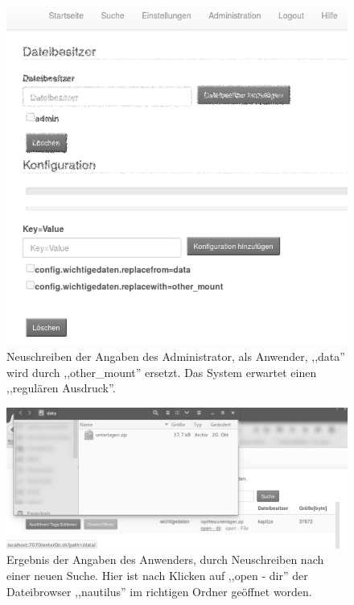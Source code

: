 \documentclass[oneside, ngerman, toc=bibliography,bibliography=totoc,listof=entryprefix, open=right,numbers=noenddot,fontsize=12pt]{scrbook}
\begin{document}
\begin{figure}[htbp] 
    \centering
    \includegraphics[width=\textwidth]{Masterarbeit_Bilder/user_rewrite_other_mount.png}
    \caption{Neuschreiben der Angaben des Administrator, als Anwender, ,,data'' wird durch ,,other\_mount'' ersetzt. Das System erwartet einen ,,regulären Ausdruck''. }
    \label{fig:www-subpath3}
\end{figure}  

\begin{figure}[htbp] 
    \centering
    \includegraphics[width=\textwidth]{Masterarbeit_Bilder/open_mount_dir.png}
    \caption{Ergebnis der Angaben des Anwenders, durch Neuschreiben nach einer neuen Suche. Hier ist nach Klicken auf ,,open - dir'' der Dateibrowser ,,nautilus'' im richtigen Ordner geöffnet worden.}
    \label{fig:www-erg2}
\end{figure}  
\end{document}
